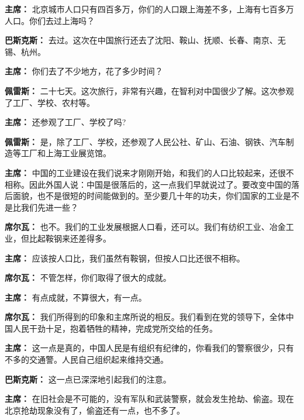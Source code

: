 \begin{list}{}
\item[\textbf{主席：}] 北京城市人口只有四百多万，你们的人口跟上海差不多，上海有七百多万人口。你们去过上海吗？

\item[\textbf{巴斯克斯：}] 去过。这次在中国旅行还去了沈阳、鞍山、抚顺、长春、南京、无锡、杭州。

\item[\textbf{主席：}] 你们去了不少地方，花了多少时间？

\item[\textbf{佩雷斯：}] 二十七天。这次旅行，非常有兴趣，在智利对中国很少了解。这次参观了工厂、学校、农村等。

\item[\textbf{主席：}] 还参观了工厂、学校了吗?

\item[\textbf{佩雷斯：}] 是，除了工厂、学校，还参观了人民公社、矿山、石油、钢铁、汽车制造等工厂和上海工业展览馆。

\item[\textbf{主席：}]中国的工业建设在我们说来才刚刚开始，和我们的人口比较起来，还很不相称。因此外国人说：中国是很落后的，这一点我们早就说过了。要改变中国的落后面貌，也不是很短的时间能做到的。至少要几十年的功夫，你们国家的工业是不是比我们先进一些？

\item[\textbf{席尔瓦：}] 也不。我们的工业发展根据人口看，还可以。我们有纺织工业、冶金工业，但比起鞍钢来还差得多。

\item[\textbf{主席：}] 应该按人口比，我们虽然有鞍钢，但按人口比还很不相称。

\item[\textbf{席尔瓦：}]不管怎样，你们取得了很大的成就。

\item[\textbf{主席：}] 有点成就，不算很大，有一点。

\item[\textbf{席尔瓦：}] 我们所得到的印象和主席所说的相反。我们看到在党的领导下，全体中国人民干劲十足，抱着牺牲的精神，完成党所交给的任务。

\item[\textbf{主席：}] 这一点是真的，中国人民是有组织有纪律的，你看我们的警察很少，只有不多的交通警。人民自己组织起来维持交通。

\item[\textbf{巴斯克斯：}] 这一点已深深地引起我们的注意。

\item[\textbf{主席：}] 在旧社会是不可能的，没有军队和武装警察，就会发生抢劫、偷盗。现在北京抢劫现象没有了，偷盗还有一点，也不多了。


\end{list}
